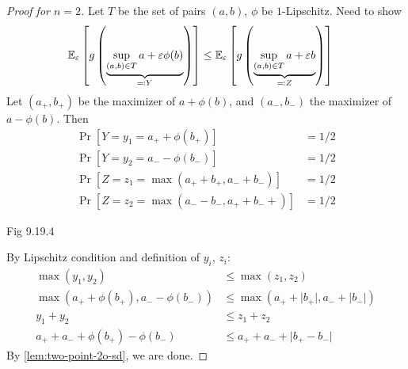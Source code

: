 \begin{proof}[Proof for $n=2$]
  Let $T$ be the set of pairs $(a,b)$, $\phi$ be $1$-Lipschitz.
  Need to show
  \begin{align}
    \mathbb{E}_\varepsilon\left[
      g\left(
        \underbrace{\sup_{(a,b) \in T} a + \varepsilon \phi(b)}_{\eqqcolon Y}
      \right)
    \right]
    &\leq
    \mathbb{E}_\varepsilon\left[
      g\left(
        \underbrace{\sup_{(a,b) \in T} a + \varepsilon b}_{\eqqcolon Z}
      \right)
    \right]
  \end{align}
  Let $(a_+, b_+)$ be the maximizer of $a + \phi(b)$, and
  $(a_-, b_-)$ the maximizer of $a - \phi(b)$. Then
  \begin{align}
    \Pr[Y = y_1 = a_+ + \phi(b_+)] &= 1/2 \\
    \Pr[Y = y_2 = a_- - \phi(b_-)] &= 1/2 \\
    \Pr[Z = z_1 = \max(a_+ + b_+, a_- + b_-)] &= 1/2 \\
    \Pr[Z = z_2 = \max(a_- - b_-, a_+ + b_-+)] &= 1/2
  \end{align}

  Fig 9.19.4

  By Lipschitz condition and definition of $y_i$, $z_i$:
  \begin{align}
    \max(y_1, y_2) &\leq \max(z_1, z_2) \\
    \max(a_+ + \phi(b_+), a_- - \phi(b_-))
                   &\leq \max(a_+ + \lvert b_+ \rvert, a_- + \lvert b_- \rvert) \\
    y_1 + y_2 &\leq z_1 + z_2 \\
    a_+ + a_- + \phi(b_+) - \phi(b_-)
              &\leq a_+ + a_- + \lvert b_+ - b_- \rvert
  \end{align}
  By \cref{lem:two-point-2o-sd}, we are done.
\end{proof}

